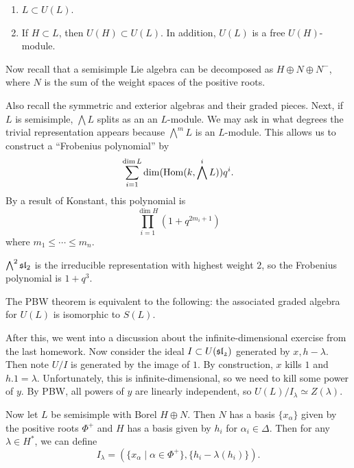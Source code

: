 \documentclass[twoside, 10pt]{article}
\begin{document}
    \begin{cor} \begin{enumerate} \item $L \subset U(L)$.  \item If $H \subset
    L$, then $U(H) \subset U(L)$. In addition, $U(L)$ is a free $U(H)$-module.
    \end{enumerate} \end{cor}

    Now recall that a semisimple Lie algebra can be decomposed as $H \oplus N
    \oplus N^-$, where $N$ is the sum of the weight spaces of the positive
    roots.

    Also recall the symmetric and exterior algebras and their graded pieces.
    Next, if $L$ is semisimple, $\bigwedge L$ splits as an an $L$-module. We
    may ask in what degrees the trivial representation appears because
    $\bigwedge^m L$ is an $L$-module. This allows us to construct a ``Frobenius
    polynomial'' by \[ \sum_{i=1}^{\dim L} \dim (\operatorname{Hom}(k, \bigwedge^i L))q^i.\]
    By a result of Konstant, this polynomial is \[ \prod_{i=1}^{\dim H} (1 +
    q^{2m_i + 1}) \] where $m_1 \leq \cdots \leq m_n$.

    \begin{exm} $\bigwedge^2 \mathfrak{sl}_2$ is the irreducible representation with
    highest weight $2$, so the Frobenius polynomial is $1+q^3$.  \end{exm}

    \begin{cor} The PBW theorem is equivalent to the following: the associated
    graded algebra for $U(L)$ is isomorphic to $S(L)$.  \end{cor}
    
    After this, we went into a discussion about the infinite-dimensional
    exercise from the last homework. Now consider the ideal $I \subset
    U(\mathfrak{{sl}_2})$ generated by $x, h - \lambda$. Then note $U/I$ is generated
    by the image of $1$. By construction, $x$ kills $1$ and $h.1 = \lambda$.
    Unfortunately, this is infinite-dimensional, so we need to kill some power
    of $y$. By PBW, all powers of $y$ are linearly independent, so
    $U(L)/I_{\lambda} \simeq Z(\lambda)$.

    Now let $L$ be semisimple with Borel $H \oplus N$. Then $N$ has a basis
    $\{x_{\alpha}\}$ given by the positive roots $\Phi^+$ and $H$ has a basis
    given by $h_i$ for $\alpha_i \in \Delta$. Then for any $\lambda \in H^*$,
    we can define \[ I_{\lambda} = (\{ x_{\alpha} \mid \alpha \in \Phi^+ \}, \{
    h_i - \lambda(h_i) \}). \]
\end{document}
